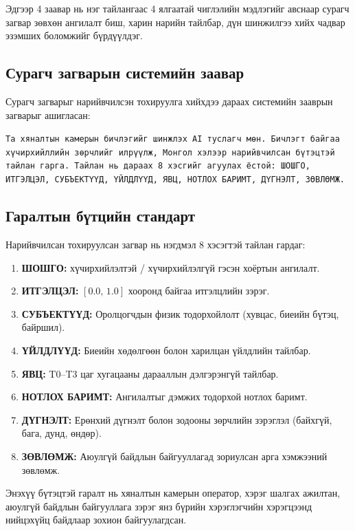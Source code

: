 Эдгээр 4 заавар нь нэг тайлангаас 4 ялгаатай чиглэлийн мэдлэгийг авснаар сурагч загвар зөвхөн ангилалт биш, харин нарийн тайлбар, дүн шинжилгээ хийх чадвар эзэмших боломжийг бүрдүүлдэг.

\subsection{Сурагч загварын системийн заавар}

Сурагч загварыг нарийвчилсэн тохируулга хийхдээ дараах системийн зааврын загварыг ашигласан:

\begin{tcolorbox}[tab2, title={Сурагч загварын системийн заавар}]
\small\texttt{Та хяналтын камерын бичлэгийг шинжлэх AI туслагч мөн. Бичлэгт байгаа хүчирхийллийн зөрчлийг илрүүлж, Монгол хэлээр нарийвчилсан бүтэцтэй тайлан гарга. Тайлан нь дараах 8 хэсгийг агуулах ёстой: ШОШГО, ИТГЭЛЦЭЛ, СУБЪЕКТҮҮД, ҮЙЛДЛҮҮД, ЯВЦ, НОТЛОХ БАРИМТ, ДҮГНЭЛТ, ЗӨВЛӨМЖ.}
\end{tcolorbox}

\subsection{Гаралтын бүтцийн стандарт}

Нарийвчилсан тохируулсан загвар нь нэгдмэл 8 хэсэгтэй тайлан гардаг:

\begin{enumerate}
    \item \textbf{ШОШГО:} хүчирхийлэлтэй / хүчирхийлэлгүй гэсэн хоёртын ангилалт.
    \item \textbf{ИТГЭЛЦЭЛ:} $[0.0,\, 1.0]$ хооронд байгаа итгэлцлийн зэрэг.
    \item \textbf{СУБЪЕКТҮҮД:} Оролцогчдын физик тодорхойлолт (хувцас, биеийн бүтэц, байршил).
    \item \textbf{ҮЙЛДЛҮҮД:} Биеийн хөдөлгөөн болон харилцан үйлдлийн тайлбар.
    \item \textbf{ЯВЦ:} T0--T3 цаг хугацааны дарааллын дэлгэрэнгүй тайлбар.
    \item \textbf{НОТЛОХ БАРИМТ:} Ангилалтыг дэмжих тодорхой нотлох баримт.
    \item \textbf{ДҮГНЭЛТ:} Ерөнхий дүгнэлт болон зодооны зөрчлийн зэрэглэл (байхгүй, бага, дунд, өндөр).
    \item \textbf{ЗӨВЛӨМЖ:} Аюулгүй байдлын байгууллагад зориулсан арга хэмжээний зөвлөмж.
\end{enumerate}

Энэхүү бүтэцтэй гаралт нь хяналтын камерын оператор, хэрэг шалгах ажилтан, аюулгүй байдлын байгууллага зэрэг янз бүрийн хэрэглэгчийн хэрэгцээнд нийцэхүйц байдлаар зохион байгуулагдсан.
